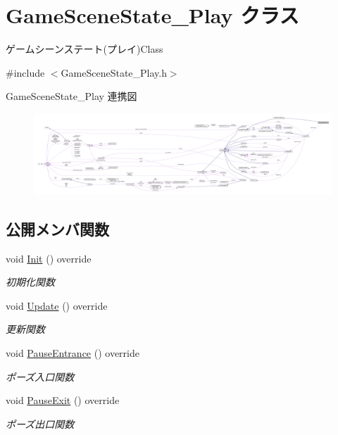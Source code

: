 \hypertarget{class_game_scene_state___play}{}\section{Game\+Scene\+State\+\_\+\+Play クラス}
\label{class_game_scene_state___play}


ゲームシーンステート(プレイ)Class  




{\ttfamily \#include $<$Game\+Scene\+State\+\_\+\+Play.\+h$>$}



Game\+Scene\+State\+\_\+\+Play 連携図\nopagebreak
\begin{figure}[H]
\begin{center}
\leavevmode
\includegraphics[width=350pt]{class_game_scene_state___play__coll__graph}
\end{center}
\end{figure}
\subsection*{公開メンバ関数}
\begin{DoxyCompactItemize}
\item 
void \mbox{\hyperlink{class_game_scene_state___play_a2637c407c8bbe0ef76b472c5b63e8057}{Init}} () override
\begin{DoxyCompactList}\small\item\em 初期化関数 \end{DoxyCompactList}\item 
void \mbox{\hyperlink{class_game_scene_state___play_a14fa99f6138f6c4ef8598210cdb6cc06}{Update}} () override
\begin{DoxyCompactList}\small\item\em 更新関数 \end{DoxyCompactList}\item 
void \mbox{\hyperlink{class_game_scene_state___play_a3bd935dc9cf71fc77d35a1e9001b0d94}{Pause\+Entrance}} () override
\begin{DoxyCompactList}\small\item\em ポーズ入口関数 \end{DoxyCompactList}\item 
void \mbox{\hyperlink{class_game_scene_state___play_ae564bcc1a570009c144722f252cb73ff}{Pause\+Exit}} () override
\begin{DoxyCompactList}\small\item\em ポーズ出口関数 \end{DoxyCompactList}\end{DoxyCompactItemize}
